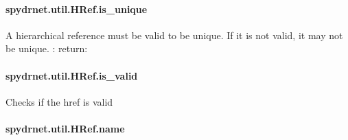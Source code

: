 \documentclass[letterpaper,10pt,english,openany,oneside]{sphinxmanual}
\begin{document}
\paragraph{spydrnet.util.HRef.is\_unique}
\label{\detokenize{reference/classes/generated/spydrnet.util.HRef.is_unique:spydrnet-util-href-is-unique}}\label{\detokenize{reference/classes/generated/spydrnet.util.HRef.is_unique::doc}}

\begin{fulllineitems}
\label{\detokenize{reference/classes/generated/spydrnet.util.HRef.is_unique:spydrnet.util.HRef.is_unique}}
A hierarchical reference must be valid to be unique. If it is not valid, it may not be unique.
: return:

\end{fulllineitems}



\paragraph{spydrnet.util.HRef.is\_valid}
\label{\detokenize{reference/classes/generated/spydrnet.util.HRef.is_valid:spydrnet-util-href-is-valid}}\label{\detokenize{reference/classes/generated/spydrnet.util.HRef.is_valid::doc}}

\begin{fulllineitems}
\label{\detokenize{reference/classes/generated/spydrnet.util.HRef.is_valid:spydrnet.util.HRef.is_valid}}
Checks if the href is valid

\end{fulllineitems}



\paragraph{spydrnet.util.HRef.name}
\label{\detokenize{reference/classes/generated/spydrnet.util.HRef.name:spydrnet-util-href-name}}\label{\detokenize{reference/classes/generated/spydrnet.util.HRef.name::doc}}
\end{document}
